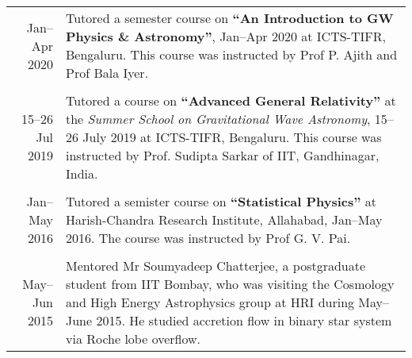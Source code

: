 \documentclass[12pt]{article}
\begin{document}
\begin{longtable}{rp{14cm}}
  Jan--Apr 2020 & {Tutored} a semester course on {\bfseries ``An Introduction to GW Physics \& Astronomy''}, Jan--Apr 2020 at ICTS-TIFR, Bengaluru. This course was instructed by Prof P. Ajith and Prof Bala Iyer.\\\\

  15--26 Jul 2019 & {Tutored} a course on {\bfseries ``Advanced General Relativity''} at the {\itshape Summer School on Gravitational Wave Astronomy}, 15--26 July 2019 at ICTS-TIFR, Bengaluru. This course was instructed by Prof. Sudipta Sarkar of IIT, Gandhinagar, India.\\\\

  Jan--May 2016 & {Tutored} a semister course on {\bfseries ``Statistical Physics''} at Harish-Chandra Research Institute, Allahabad, Jan--May 2016. The course was instructed by Prof G. V. Pai.\\\\

  May--Jun 2015 & {Mentored} Mr Soumyadeep Chatterjee, a postgraduate student from IIT Bombay, who was visiting the Cosmology and High Energy Astrophysics group at HRI during May--June 2015. He studied accretion flow in binary star system via Roche lobe overflow.
\end{longtable}
\end{document}

